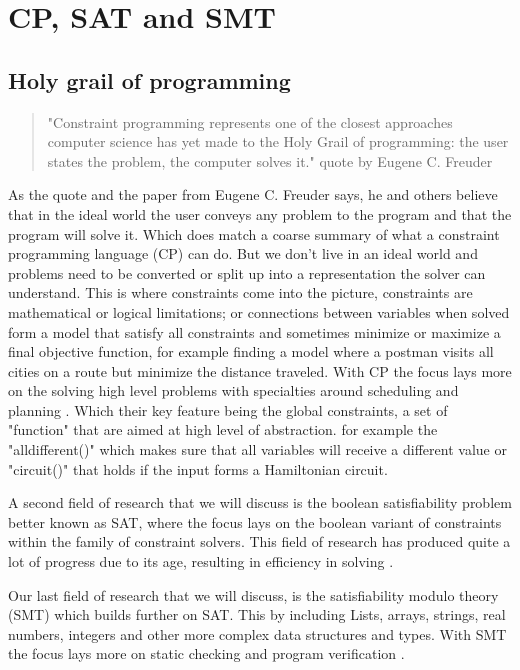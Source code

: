 \chapter{CP, SAT and SMT}
\label{cha:CS}

\section{Holy grail of programming} %
\label{CS:HolyGrail}
\begin{quote}
	"Constraint programming represents one of the closest approaches computer science has yet made to the Holy Grail of programming: the user states the problem, the computer solves it." \cite{11freuder1997pursuitHolyGrail} quote by Eugene C. Freuder
\end{quote}
As the quote and the paper from Eugene C. Freuder says, he and others believe that in the ideal world the user conveys any problem to the program and that the program will solve it. Which does match a coarse summary of what a constraint programming language (CP) can do. But we don't live in an ideal world and problems need to be converted or split up into a representation the solver can understand. This is where constraints come into the picture, constraints are mathematical or logical limitations; or connections between variables when solved form a model that satisfy all constraints and sometimes minimize or maximize a final objective function, for example finding a model where a postman visits all cities on a route but minimize the distance traveled. 
With CP the focus lays more on the solving high level problems with specialties around scheduling and planning \cite{52bartak1999constraint}. Which their key feature being the global constraints, a set of "function" that are aimed at high level of abstraction. for example the "alldifferent()" which makes sure that all variables will receive a different value or "circuit()" that holds if the input forms a Hamiltonian circuit.

A second field of research that we will discuss is the boolean satisfiability problem better known as SAT, where the focus lays on the boolean variant of constraints within the family of constraint solvers. This field of research has produced quite a lot of progress due to its age, resulting in efficiency in solving \cite{56bardin2019bringing}.

Our last field of research that we will discuss, is the satisfiability modulo theory (SMT) which builds further on SAT. This by including Lists, arrays, strings, real numbers, integers and other more complex data structures and types. With SMT the focus lays more on static checking and program verification \cite{56bardin2019bringing, 54moura2008z3}.


